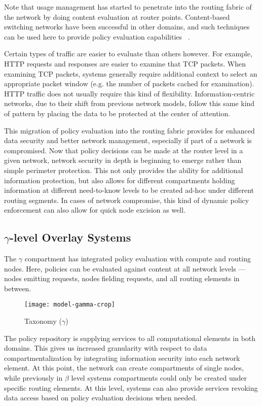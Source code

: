 Note that usage management has started to penetrate into the routing fabric of the network by doing content evaluation at router points.  Content-based switching networks have been successful in other domains, and such techniques can be used here to provide policy evaluation capabilities ~\cite{proposal:jboss-esb}.  

Certain types of traffic are easier to evaluate than others however.  For example, HTTP requests and responses are easier to examine that TCP packets.  When examining TCP packets, systems generally require additional context to select an appropriate packet window (e.g. the number of packets cached for examination).  HTTP traffic does not usually require this kind of flexibility.  Information-centric networks, due to their shift from previous network models, follow this same kind of pattern by placing the data to be protected at the center of attention.

This migration of policy evaluation into the routing fabric provides for enhanced data security and better network management, especially if part of a network is compromised.  Now that policy decisions can be made at the router level in a given network, network security in depth is beginning to emerge rather than simple perimeter protection.  This not only provides the ability for additional information protection, but also allows for different compartments holding information at different need-to-know levels to be created ad-hoc under different routing segments.  In cases of network compromise, this kind of dynamic policy enforcement can also allow for quick node excision as well.

\subsection{$\gamma$-level Overlay Systems}
The $\gamma$ compartment has integrated policy evaluation with compute and routing nodes.  Here, policies can be evaluated against content at all network levels --- nodes emitting requests, nodes fielding requests, and all routing elements in between.

\begin{figure}[!t]
\centering
\texttt{[image: model-gamma-crop]}
\caption{Taxonomy ($\gamma$)}
\label{fig:model:taxonomy-gamma}
\end{figure}

The policy repository is supplying services to all computational elements in both domains.  This gives us increased granularity with respect to data compartmentalization by integrating information security into each network element.  At this point, the network can create compartments of single nodes, while previously in $\beta$ level systems compartments could only be created under specific routing elements.  At this level, systems can also provide services revoking data access based on policy evaluation decisions when needed.

